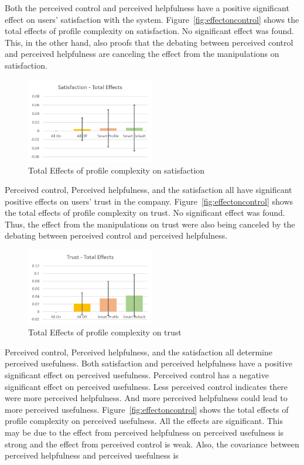 Both the perceived control and perceived helpfulness have a positive significant effect on users' satisfaction with the system. Figure~\ref{fig:effectoncontrol} shows the total effects of profile complexity on satisfaction. No significant effect was found. This, in the other hand, also proofs that the debating between perceived control and perceived helpfulness are canceling the effect from the manipulations on satisfaction.

\begin{figure}[ht]
	\centering
	\includegraphics[width=0.5\textwidth]{figures/effectonsatisfaction.png}
	\caption{Total Effects of profile complexity on satisfaction}
	\label{fig:effectonsatisfaction}
\end{figure}

Perceived control, Perceived helpfulness, and the satisfaction all have significant positive effects on users' trust in the company. Figure~\ref{fig:effectoncontrol} shows the total effects of profile complexity on trust. No significant effect was found. Thus, the effect from the manipulations on trust were also being canceled by the debating between perceived control and perceived helpfulness.

\begin{figure}[ht]
	\centering
	\includegraphics[width=0.5\textwidth]{figures/effectontrust.png}
	\caption{Total Effects of profile complexity on trust}
	\label{fig:effectontrust}
\end{figure}

Perceived control, Perceived helpfulness, and the satisfaction all determine perceived usefulness. Both satisfaction and perceived helpfulness have a positive significant effect on perceived usefulness. Perceived control has a negative significant effect on perceived usefulness. Less perceived control indicates there were more perceived helpfulness. And more perceived helpfulness could lead to more perceived usefulness. Figure~\ref{fig:effectoncontrol} shows the total effects of profile complexity on perceived usefulness. All the effects are significant. This may be due to the effect from perceived helpfulness on perceived usefulness is strong and the effect from perceived control is weak. Also, the covariance between perceived helpfulness and perceived usefulness is 

